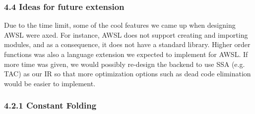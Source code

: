 \documentclass[10pt,a4paper]{report}
\newenvironment{tabularverbatim}
 {\VerbatimEnvironment
  \begin{BVerbatim}[baseline=c,formatcom=\setlength{\baselineskip}{\normalbaselineskip}]}
 {\end{BVerbatim}}
\begin{document}
  \subsubsection*{4.4 Ideas for future extension}
  Due to the time limit, some of the cool features we came up when designing
  AWSL were axed. For instance, AWSL does not support creating and importing
  modules, and as a consequence, it does not have a standard library. Higher
  order functions was also a language extension we expected to implement for
  AWSL. If more time was given, we would possibly re-design the backend to use
  SSA (e.g. TAC) as our IR so that more optimization options such as dead code
  elimination would be easier to implement.

  \appendixpage

  \subsubsection*{4.2.1 Constant Folding}
  \begin{center}
  \end{center}
\end{document}
